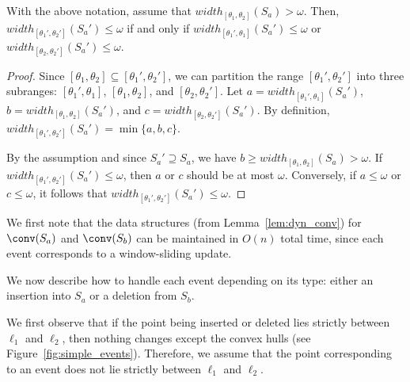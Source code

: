 \begin{lemma}
    \label{lem:width_test_obs}
    With the above notation, assume that $width_{[\theta_1, \theta_2]}(S_a) > \omega$. 
Then, \\$width_{[\theta_1', \theta_2']} (S_a') \le \omega$ if and only if 
$width_{[\theta_1' , \theta_1]}(S_a') \le \omega$ or
$width_{[\theta_2, \theta_2']}(S_a') \le \omega$.
\end{lemma}


\begin{proof}
    Since $[\theta_1, \theta_2] \subseteq [\theta_1', \theta_2']$,
    we can partition the range $[\theta_1', \theta_2']$ into three subranges: $[\theta_1', \theta_1]$, $[\theta_1, \theta_2]$, and $[\theta_2, \theta_2']$.
    Let $a = width_{[\theta_1', \theta_1]}(S_a')$, 
    $b = width_{[\theta_1, \theta_2]}(S_a')$, and 
    $c = width_{[\theta_2, \theta_2']}(S_a')$.
    By definition, $width_{[\theta_1', \theta_2']}(S_a') = \min \{a, b, c \}$. 

    By the assumption and since $S_a' \supseteq S_a$, we have $b \ge width_{[\theta_1, \theta_2]}(S_a) > \omega$.
    If $width_{[\theta_1', \theta_2']}(S_a') \allowbreak \le \omega$, then $a$ or $c$ should be at most $\omega$.
    Conversely, if $a \le \omega$ or $c \le \omega$, it follows that $width_{[\theta_1', \theta_2']}(S_a') \le \omega$.
\end{proof}






We first note that the data structures (from Lemma~\ref{lem:dyn_conv}) for $\conv(S_a)$ and $\conv(S_b)$ can be maintained in $O(n)$ total time, since each event corresponds to a window-sliding update.



We now describe how to handle each event depending on its type: either an insertion into $S_a$ or a deletion from $S_b$.

We first observe that if the point being inserted or deleted lies strictly between $\ell_1$ and $\ell_2$, then nothing changes except the convex hulls (see Figure~\ref{fig:simple_events}).
Therefore, we assume that the point corresponding to an event does not lie strictly between $\ell_1$ and $\ell_2$.


